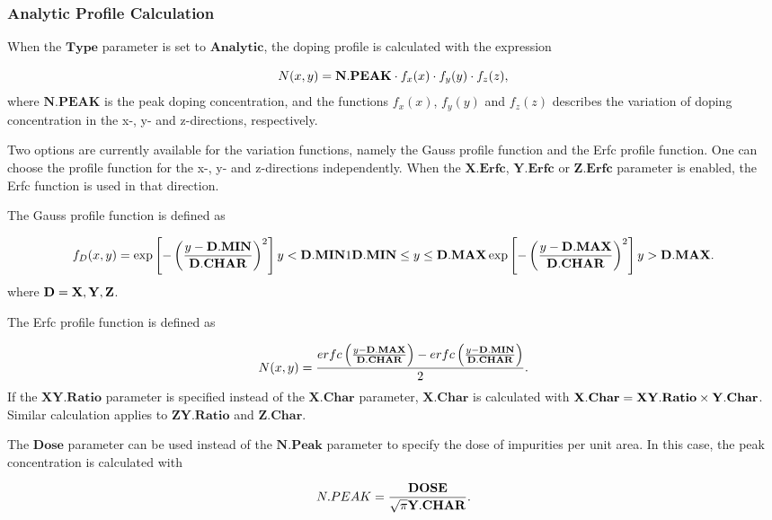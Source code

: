 \documentclass[oneside,12pt]{cgd_book}
\begin{document}
\subsubsection{Analytic Profile Calculation}
When the $\mathbf{Type}$ parameter is set to $\mathbf{Analytic}$, the doping
          profile is calculated with the expression
\par
\begin{equation}
N(x,y) = {\bf N.PEAK} \cdot f_x(x) \cdot f_y(y) \cdot f_z(z),
\end{equation}
where $\mathbf{N.PEAK}$ is the peak doping concentration, and the functions
$f_x(x)$, $f_y(y)$ and $f_z(z)$ describes the variation of doping concentration in the x-, y- and z-directions, respectively.
\par
Two options are currently available for the variation functions, namely the Gauss profile function and
          the Erfc profile function. One can choose the profile function for the x-, y- and z-directions independently.
          When the $\mathbf{X.Erfc}$, $\mathbf{Y.Erfc}$ or $\mathbf{Z.Erfc}$
parameter is enabled, the Erfc function is used in that direction.
\par
The Gauss profile function is defined as
\par
\begin{equation}
f_D(x,y) =  \exp\left[-\left(\frac{y-{\bf D.MIN}}{\bf D.CHAR}\right)^2\right]
            y < {\bf D.MIN} \\   1   {\bf D.MIN}\le y \le {\bf D.MAX} \\
            \exp\left[-\left(\frac{y-{\bf D.MAX}}{\bf D.CHAR}\right)^2\right]   y>{\bf D.MAX} \\
            .
\end{equation}
where ${\bf D} = {\bf X}, {\bf Y}, {\bf Z}$.
\par
The Erfc profile function is defined as
\par
\begin{equation}
N(x,y) = \frac{ erfc\left( \frac{y-{\bf D.MAX}}{\bf D.CHAR} \right) - erfc\left( \frac{y-{\bf
            D.MIN}}{\bf D.CHAR} \right) }{2}.
\end{equation}
If the $\mathbf{XY.Ratio}$ parameter is specified instead of the
$\mathbf{X.Char}$ parameter, $\mathbf{X.Char}$ is calculated with
${\bf X.Char}={\bf XY.Ratio}\times{\bf Y.Char}$. Similar calculation applies to
$\mathbf{ZY.Ratio}$ and $\mathbf{Z.Char}$.
\par
{}The $\mathbf{Dose}$ parameter can be used instead of the
$\mathbf{N.Peak}$ parameter to specify the dose of impurities per unit area. In this case, the peak concentration is
            calculated with
\par
\par
\begin{equation}
N.PEAK = \frac{\bf DOSE}{\sqrt{\pi} {\bf Y.CHAR}}.
\end{equation}
\end{document}
